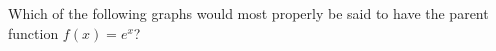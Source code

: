 \documentclass{ximera}
\begin{document}
\begin{problem}
\begin{multipleChoice}
{            }
    \end{multipleChoice}
    \end{problem}





\begin{problem}
    Which of the following graphs would most properly be said to have the parent function $f(x) = e^x$?
    \begin{multipleChoice}
\end{multipleChoice}
\end{problem}
\end{document}
